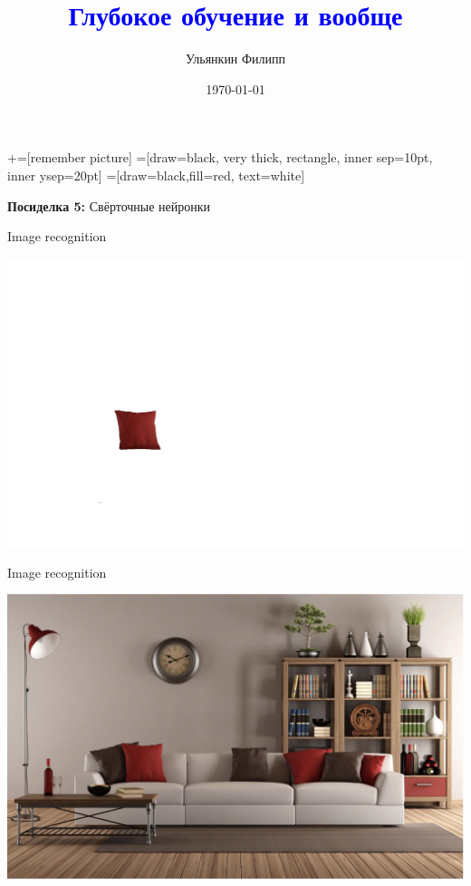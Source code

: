 \documentclass[notes,12pt, aspectratio=169]{beamer}
\title[]{\textcolor{blue}{Глубокое обучение и вообще}}
\author{Ульянкин Филипп}
\date{\today}
\begin{document}
\newcommand\marktopleft[1]{%
    \tikz[overlay,remember picture] 
        \node (marker-#1-a) at (-.3em,.3em) {};%
}
\newcommand\markbottomright[2]{%
    \tikz[overlay,remember picture] 
        \node (marker-#1-b) at (0em,0em) {};%
}
+=[remember picture] 
 =[draw=black, very thick, rectangle, inner sep=10pt, inner ysep=20pt]
 =[draw=black,fill=red, text=white]


\begin{frame}
\maketitle
\centering \textbf{\color{blue} Посиделка 5:}  Свёрточные нейронки
\end{frame}


\begin{frame}{Image recognition}
\begin{center}
	\includegraphics[width=.8\linewidth]{pilow.png}
\end{center}
\end{frame}


\begin{frame}{Image recognition}
\begin{center}
	\includegraphics[width=.8\linewidth]{pilow2.png}
\end{center}
\end{frame}
\end{document}
